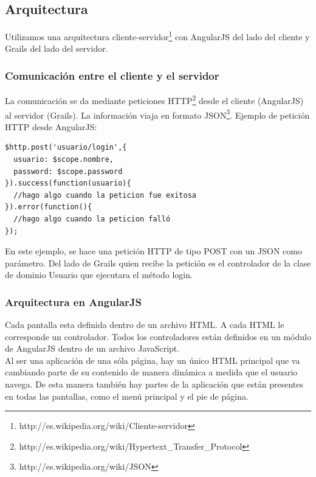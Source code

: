 \subsection{Arquitectura}
Utilizamos una arquitectura cliente-servidor\footnote{http://es.wikipedia.org/wiki/Cliente-servidor} con AngularJS del lado del cliente y Grails del lado del servidor. 
\subsubsection{Comunicación entre el cliente y el servidor}
La comunicación se da mediante peticiones HTTP\footnote{http://es.wikipedia.org/wiki/Hypertext\_Transfer\_Protocol} desde el cliente (AngularJS) al servidor (Grails). La información viaja en formato JSON\footnote{http://es.wikipedia.org/wiki/JSON}. Ejemplo de petición HTTP desde AngularJS:\\
\begin{verbatim}
$http.post('usuario/login',{
  usuario: $scope.nombre,
  password: $scope.password
}).success(function(usuario){
  //hago algo cuando la peticion fue exitosa
}).error(function(){
  //hago algo cuando la peticion falló
});		
\end{verbatim}
En este ejemplo, se hace una petición HTTP de tipo POST con un JSON como parámetro. Del lado de Grails quien recibe la petición es el controlador de la clase de dominio Usuario que ejecutara el método login.
\subsubsection{Arquitectura en AngularJS}
Cada pantalla esta definida dentro de un archivo HTML. A cada HTML le corresponde un controlador. Todos los controladores están definidos en un módulo de AngularJS dentro de un archivo JavaScript.\\
Al ser una aplicación de una sóla página, hay un único HTML principal que va cambiando parte de su contenido de manera dinámica a medida que el usuario navega. De esta manera también hay partes de la aplicación que están presentes en todas las pantallas, como el menú principal y el pie de página.
